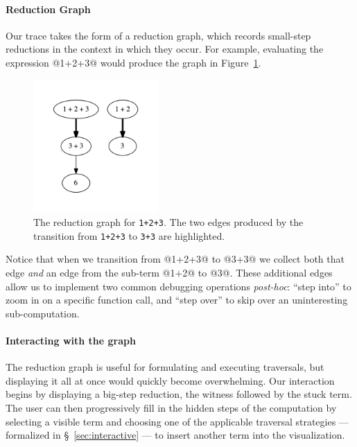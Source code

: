 \paragraph{Reduction Graph}
Our trace takes the form of a reduction graph, which records small-step
reductions in the context in which they occur.
%
%
For example, evaluating the expression @1+2+3@ would produce the
graph in Figure~\ref{fig:simple-reduction-hi}.
%
\begin{figure}[t]
  \centering
  \includegraphics[height=2in]{simple.png}
  \caption{The reduction graph for \texttt{1+2+3}. The two edges
    produced by the transition from \texttt{1+2+3} to \hbox{\texttt{3+3}}
    are highlighted.}
\label{fig:simple-reduction-hi}
\end{figure}
%
Notice that when we transition from @1+2+3@ to @3+3@ we collect
both that edge \emph{and} an edge from the sub-term @1+2@ to @3@.
%
These additional edges allow us to implement two common debugging
operations \emph{post-hoc}: ``step into'' to zoom in on a specific
function call, and ``step over'' to skip over an uninteresting
sub-computation.

\paragraph{Interacting with the graph}
The reduction graph is useful for formulating and executing traversals,
but displaying it all at once would quickly become overwhelming.
%
Our interaction begins by displaying a big-step reduction, \ie the
witness followed by the stuck term.
%
The user can then progressively fill in the hidden steps of the
computation by selecting a visible term and choosing one of the
applicable traversal strategies --- formalized in
\S~\ref{sec:interactive} --- to insert another term into the
visualization.


